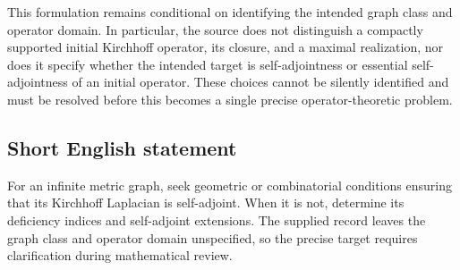 \documentclass[11pt]{article}
\begin{document}
This formulation remains conditional on identifying the intended graph class and operator domain. In particular, the source does not distinguish a compactly supported initial Kirchhoff operator, its closure, and a maximal realization, nor does it specify whether the intended target is self-adjointness or essential self-adjointness of an initial operator. These choices cannot be silently identified and must be resolved before this becomes a single precise operator-theoretic problem.
\subsection{Short English statement}
For an infinite metric graph, seek geometric or combinatorial conditions ensuring that its Kirchhoff Laplacian is self-adjoint. When it is not, determine its deficiency indices and self-adjoint extensions. The supplied record leaves the graph class and operator domain unspecified, so the precise target requires clarification during mathematical review.
\end{document}
